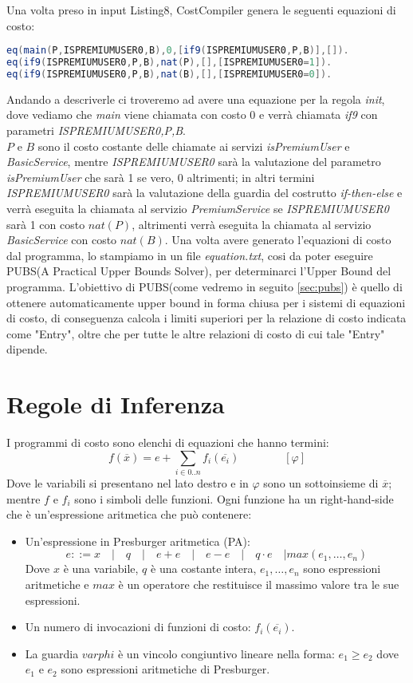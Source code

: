 \documentclass[../../main.tex]{subfiles}
\begin{document}
Una volta preso in input Listing8, CostCompiler genera le seguenti equazioni di costo:
\begin{lstlisting}[language=Java, caption={Equazioni di costo per Listing8}]
eq(main(P,ISPREMIUMUSER0,B),0,[if9(ISPREMIUMUSER0,P,B)],[]).
eq(if9(ISPREMIUMUSER0,P,B),nat(P),[],[ISPREMIUMUSER0=1]).
eq(if9(ISPREMIUMUSER0,P,B),nat(B),[],[ISPREMIUMUSER0=0]).
\end{lstlisting}
Andando a descriverle ci troveremo ad avere una equazione per la regola \textit{init}, dove vediamo che \textit{main} viene chiamata con costo 0 e verrà chiamata \textit{if9} con parametri \textit{ISPREMIUMUSER0,P,B}.\\
$P$ e $B$ sono il costo costante delle chiamate ai servizi \textit{isPremiumUser} e \textit{BasicService}, mentre \textit{ISPREMIUMUSER0} sarà la valutazione del parametro \textit{isPremiumUser} che sarà 1 se vero, 0 altrimenti; in altri termini \textit{ISPREMIUMUSER0} sarà la valutazione della guardia del costrutto \textit{if-then-else} e verrà eseguita la chiamata al servizio \textit{PremiumService} se \textit{ISPREMIUMUSER0} sarà 1 con costo $nat(P)$, altrimenti verrà eseguita la chiamata al servizio \textit{BasicService} con costo $nat(B)$. 
Una volta avere generato l'equazioni di costo dal programma, lo stampiamo in un file \textit{equation.txt}, cosi da poter eseguire PUBS(A Practical Upper Bounds Solver), per determinarci l'Upper Bound del programma.
L'obiettivo di PUBS(come vedremo in seguito \ref{sec:pubs}) è quello di ottenere automaticamente upper bound in forma chiusa per i sistemi di equazioni di costo, di conseguenza calcola i limiti superiori per la relazione di costo indicata come "Entry", oltre che per tutte le altre relazioni di costo di cui tale "Entry" dipende.

\section{Regole di Inferenza}
\label{sec:inference_rule}
I programmi di costo sono elenchi di equazioni che hanno termini:
$$f(\overline{x} ) = e + \sum_{i \in 0..n} f_i (\overline{e_i}) \quad \quad \quad \quad[\varphi ]$$
Dove le variabili si presentano nel lato destro e in $\varphi $ sono un sottoinsieme di $\overline{x}$; mentre $f$ e $f_i$ sono i simboli delle funzioni.
Ogni funzione ha un right-hand-side che è un'espressione aritmetica che può contenere:
\begin{itemize}
    \item Un'espressione in Presburger aritmetica (PA)\autocite{DBLP:journals/corr/Haase14}:
    $$e ::= x \quad | \quad q \quad | \quad e + e \quad | \quad e - e \quad | \quad q \cdot e \quad |  max(e_1,\dots,e_n)$$
    Dove $x$ è una variabile, $q$ è una costante intera, $e_1,\dots,e_n$ sono espressioni aritmetiche e $max$ è un operatore che restituisce il massimo valore tra le sue espressioni.
    \item Un numero di invocazioni di funzioni di costo: $f_i (\overline{e_i})$.
    \item La guardia $varphi$ è un vincolo congiuntivo lineare nella forma: $e_1 \geq e_2$ dove $e_1$ e $e_2$ sono espressioni aritmetiche di Presburger.
\end{itemize} 
\end{document}
